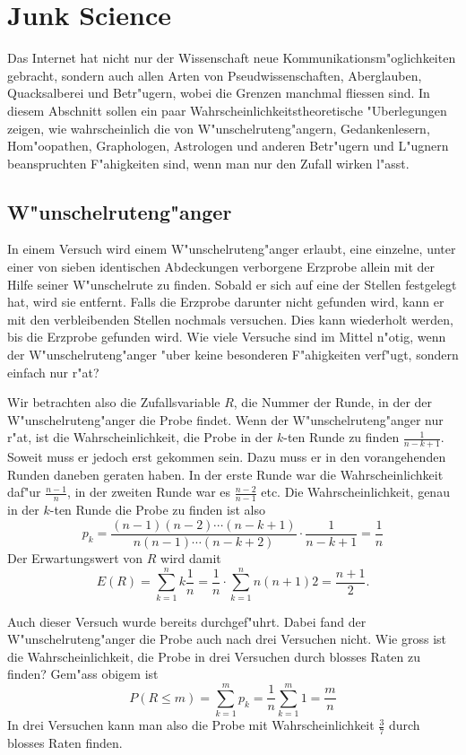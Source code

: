 %
%
%
\chapter{Junk Science}
Das Internet hat nicht nur der Wissenschaft neue Kommunikationsm"oglichkeiten
gebracht, sondern auch allen Arten von Pseudwissenschaften,
Aberglauben, Quacksalberei und Betr"ugern, wobei die Grenzen manchmal
fliessen sind. In diesem Abschnitt sollen ein paar Wahrscheinlichkeitstheoretische
"Uberlegungen zeigen, wie wahrscheinlich die von W"unschelruteng"angern,
Gedankenlesern, Hom"oo\-pathen, Graphologen, Astrologen und anderen Betr"ugern
und L"ugnern beanspruchten F"ahigkeiten sind, wenn man nur den Zufall wirken
l"asst.

\section{W"unschelruteng"anger}
In einem Versuch wird einem W"unschelruteng"anger erlaubt, eine einzelne,
unter einer von sieben identischen Abdeckungen verborgene Erzprobe allein
mit der Hilfe seiner W"unschelrute zu finden. Sobald er sich auf eine
der Stellen festgelegt hat, wird sie entfernt. Falls die Erzprobe darunter
nicht gefunden wird, kann er mit den verbleibenden Stellen nochmals
versuchen. Dies kann wiederholt werden, bis die Erzprobe gefunden wird.
Wie viele Versuche sind im Mittel n"otig, wenn der W"unschelruteng"anger
"uber keine besonderen F"ahigkeiten verf"ugt, sondern einfach nur r"at?

Wir betrachten also die Zufallsvariable $R$, die Nummer der Runde, in der
der W"unschelruteng"anger die Probe findet. Wenn der W"unschelruteng"anger
nur r"at, ist die Wahrscheinlichkeit, die Probe in der $k$-ten Runde zu finden
$\frac1{n-k+1}$. Soweit muss er jedoch erst gekommen sein. Dazu muss er in
den vorangehenden Runden daneben geraten haben. In der erste
Runde war die Wahrscheinlichkeit daf"ur $\frac{n-1}n$, in der zweiten
Runde war es $\frac{n-2}{n-1}$ etc. Die Wahrscheinlichkeit, genau in der
$k$-ten Runde die Probe zu finden ist also
$$p_k=\frac{(n-1)(n-2)\cdots (n-k+1)}{n(n-1)\cdots(n-k+2)}\cdot\frac1{n-k+1}=\frac1n$$
Der Erwartungswert von $R$ wird damit
$$E(R)=\sum_{k=1}^nk\frac1n=\frac1n\cdot\sum_{k=1}^n{n(n+1)}2=\frac{n+1}2.$$

Auch dieser Versuch wurde bereits durchgef"uhrt. Dabei fand der W"unschelruteng"anger
die Probe auch nach drei Versuchen nicht. Wie gross ist die Wahrscheinlichkeit,
die Probe in drei Versuchen durch blosses Raten zu finden? Gem"ass obigem ist
$$P(R\le m)= \sum_{k=1}^mp_k=\frac1n\sum_{k=1}^m1=\frac{m}{n}$$
In drei Versuchen kann man also die Probe mit Wahrscheinlichkeit $\frac37$ durch
blosses Raten finden.

